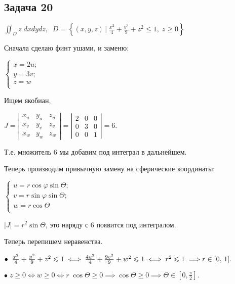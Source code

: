 \documentclass[a4paper, fleqn]{article}
\begin{document}
    
    
    
    \subsection*{Задача 20}
    
    $\iint_{D} z \; dxdydz, \; \; D = \left\{(x,y,z) \, \Big| \;  \frac{x^2}{4} + \frac{y^2 }{9} + z^2 \leq 1, \; z \geq 0 \right\} $
    
    Сначала сделаю финт ушами, и заменю:
    
    $
    \begin{cases}
    x = 2 u;\\
    y = 3 v;\\
    z = w\\
    \end{cases}
    $
    
    Ищем якобиан,
    
    $J =  \left| \begin{matrix} x_u & y_u & z_u \\ x_v & y_v & z_v \\  x_w & y_w & z_w  \end{matrix} \right| = 
      \left| \begin{matrix} 2 & 0 & 0 \\ 0 & 3 & 0 \\  0 & 0 & 1  \end{matrix} \right| = 6.$
    
    Т.е. множитель $6$ мы добавим под интеграл в дальнейшем.
    
    Теперь производим привычную замену на сферические координаты:
    
    
    $\begin{cases}
    u = r \cos \varphi \sin \Theta;\\
    v = r \sin \varphi \sin \Theta;\\
    w = r  \cos \Theta\\
    \end{cases}$
    
    $|J| = r^2 \sin \Theta$, это наряду с 6 появится под интегралом.
    
    Теперь перепишем неравенства.
    
    $\bullet \; \; \frac{x^2}{4} + \frac{y^2}{9} + z^2 \leq 1 \iff \frac{4 u^2}{4} + \frac{9 v^2}{9} + w^2 \leq 1 \iff r^2 \leq 1 \implies  \\ r \in [0, \, 1].$ 
    
    $\bullet \; z \geq 0 \iff w \geq 0 \iff r \; \cos \Theta \geq 0 \implies \cos \Theta \geq 0 \implies \Theta \in \left[0, \frac{\pi}{2}\right].$
    
\end{document}
